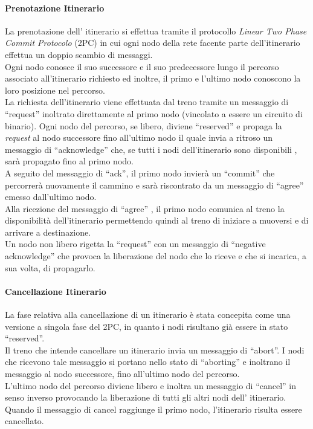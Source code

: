 \documentclass[10pt,a4paper,oneside]{report}
\begin{document}
\paragraph*{Prenotazione Itinerario}
La prenotazione dell' itinerario si effettua tramite il protocollo \emph{Linear Two Phase Commit Protocolo } (2PC) in cui ogni nodo della rete facente parte dell'itinerario effettua un doppio scambio di messaggi.\\
Ogni nodo conosce il suo successore e il suo predecessore lungo il percorso associato all'itinerario richiesto ed inoltre, il primo e l'ultimo nodo conoscono la loro posizione nel percorso.\\
La richiesta dell'itinerario viene effettuata dal treno tramite un messaggio di ``request'' inoltrato direttamente al primo nodo (vincolato a essere un circuito di binario). Ogni nodo del percorso, se libero, diviene ``reserved'' e propaga la \emph{request} al nodo successore fino all'ultimo nodo il quale invia a ritroso un messaggio di ``acknowledge'' che, se tutti i nodi dell'itinerario sono disponibili , sarà propagato fino al primo nodo.\\
A seguito del messaggio di ``ack'', il primo nodo invierà un ``commit'' che percorrerà nuovamente il cammino e sarà riscontrato da un messaggio di ``agree'' emesso dall'ultimo nodo.\\
Alla ricezione del messaggio di ``agree'' , il primo nodo comunica al treno la disponibilità dell'itinerario permettendo quindi al treno di iniziare a muoversi e di arrivare a destinazione.\\

Un nodo non libero rigetta la ``request'' con un messaggio di ``negative acknowledge'' che provoca la liberazione del nodo che lo riceve e che si incarica, a sua volta, di propagarlo.

\paragraph*{Cancellazione Itinerario}
La fase relativa alla cancellazione di un itinerario è stata concepita come una versione a singola fase del 2PC, in quanto i nodi risultano già essere in stato ``reserved''.\\
Il treno che intende cancellare un itinerario invia un messaggio di ``abort''. I nodi che ricevono tale messaggio si portano nello stato di ``aborting'' e inoltrano il messaggio al nodo successore, fino all'ultimo nodo del percorso.\\
L'ultimo nodo del percorso diviene libero e inoltra un messaggio di ``cancel'' in senso inverso provocando la liberazione di tutti gli altri nodi dell' itinerario. Quando il messaggio di cancel raggiunge il primo nodo, l'itinerario risulta essere cancellato.
\end{document}
